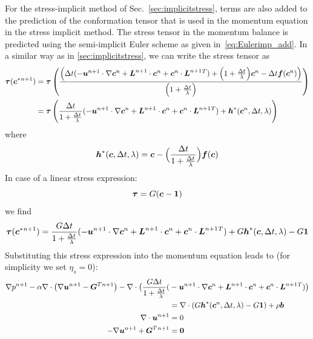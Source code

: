 For the stress-implicit method of Sec.~\ref{sec:implicitstress},
terms are also added to the prediction of
the conformation tensor that is used in the momentum equation in the stress 
implicit method. The stress tensor in the momentum balance is predicted using 
the semi-implicit Euler scheme as given in~\eqref{eq:Eulerimp_add}. 
In a similar way as in \ref{sec:implicitstress}, we can write the stress 
tensor as
\begin{equation}
  \begin{split}
   \boldsymbol{\tau}(\boldsymbol{c}^*{}^{n+1})&=
 \boldsymbol{\tau}\left(\frac{
          \Big(\Delta t(-\boldsymbol{u}^{n+1}\cdot\nabla\boldsymbol{c}^n+
          \boldsymbol{L}^{n+1}\cdot\boldsymbol{c}^n+\boldsymbol{c}^n\cdot\boldsymbol{L}^{n+1}{}^T)
          +\Big(1+\frac{\Delta t}{\lambda}\Big)\boldsymbol{c}^{n}-
           \Delta t\boldsymbol{f}(\boldsymbol{c}^n)\Big)}{\Big(1+\frac{\Delta t}{\lambda}\Big)}
      \right)\\
   &= \boldsymbol{\tau}\left(
           \frac{\Delta t}{1+\frac{\Delta t}{\lambda}}(-\boldsymbol{u}^{n+1}
           \cdot\nabla\boldsymbol{c}^n+
           \boldsymbol{L}^{n+1}\cdot\boldsymbol{c}^n+\boldsymbol{c}^n\cdot\boldsymbol{L}^{n+1}{}^T)
           +\boldsymbol{h}^*(\boldsymbol{c}^n, \Delta t, \lambda )
      \right)\\ 
  \end{split}
\end{equation}
where 
\begin{equation}
 \boldsymbol{h}^*(\boldsymbol{c}, \Delta t, \lambda)= \boldsymbol{c}-\Big(\frac{\Delta t}
  {1+\frac{\Delta t}{\lambda}}\Big)\boldsymbol{f}(\boldsymbol{c})
\end{equation}
In case of a linear stress expression:
\begin{equation}
     \boldsymbol{\tau}=G(\boldsymbol{c} - \boldsymbol{1})
\end{equation}
we find
\begin{equation}
   \boldsymbol{\tau}(\boldsymbol{c}^*{}^{n+1})=
           \frac{G \Delta t}{1+\frac{\Delta t}{\lambda}}(-\boldsymbol{u}^{n+1}
           \cdot\nabla\boldsymbol{c}^n+
           \boldsymbol{L}^{n+1}\cdot\boldsymbol{c}^n+\boldsymbol{c}^n\cdot\boldsymbol{L}^{n+1}{}^T)
           +G\boldsymbol{h}^*(\boldsymbol{c}, \Delta t, \lambda )
            -G\boldsymbol{1}
\end{equation}
Substituting this stress expression into the momentum equation leads to 
(for simplicity we set $\eta_s=0$):
\begin{align}
      \nabla p^{n+1} 
  -\alpha\nabla\cdot\big(\nabla\boldsymbol{u}^{n+1} -\boldsymbol{G}^T{}^{n+1} \big)
  -\nabla\cdot\big(\frac{G\Delta t}{1+\frac{\Delta t}{\lambda}}
   (&-\boldsymbol{u}^{n+1}\cdot\nabla\boldsymbol{c}^n+
        \boldsymbol{L}^{n+1}\cdot\boldsymbol{c}^n+
      \boldsymbol{c}^n\cdot\boldsymbol{L}^{n+1}{}^T)\big)\notag\\
&=\nabla\cdot(G \boldsymbol{h}^*(\boldsymbol{c}^n,\Delta t, \lambda) -G\boldsymbol{1})
        + \rho\boldsymbol{b}\\
     \nabla\cdot\boldsymbol{u}^{n+1}&=0\\
   -\nabla\boldsymbol{u}^{n+1} + \boldsymbol{G}^T{}^{n+1} &= \boldsymbol{0}
\end{align}
